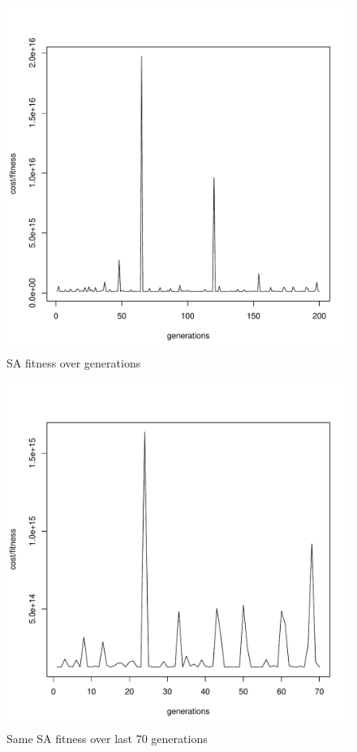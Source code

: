 \pagebreak
\begin{figure}[!h]
	\begin{center}
		\includegraphics[width=120mm]{output/sa01/graph_all.pdf}
               	\caption{SA fitness over generations}
                \label{saXX_exc}
        \end{center}
\end{figure}

\pagebreak
\begin{figure}[!h]
	\begin{center}
		\includegraphics[width=120mm]{output/sa01/graph_70.pdf}
               	\caption{Same SA fitness over last 70 generations}
                \label{sa01_70_exc}
        \end{center}
\end{figure}

